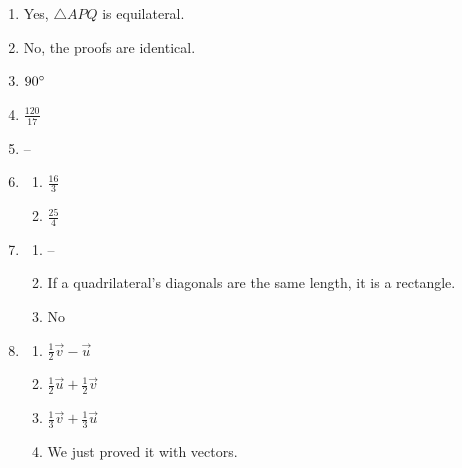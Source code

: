 \documentclass{article}
\begin{document}
\begin{enumerate}
\begin{enumerate}
	\item 104 in.$^2$
	
	\end{enumerate}
	
\item Yes, $\triangle APQ$ is equilateral.

\item No, the proofs are identical.

\item $90 \degree$

\item $\frac{120}{17}$

\item --

\item

	\begin{enumerate}
	
	\item $\frac{16}{3}$
	
	\item $\frac{25}{4}$
	
	\end{enumerate}
	
\item

	\begin{enumerate}
	
	\item --
	
	\item If a quadrilateral's diagonals are the same length, it is a rectangle.
	
	\item No
	
	\end{enumerate}
	
\item

	\begin{enumerate}
	
	\item $\frac{1}{2} \vec{v} - \vec{u}$
	
	\item $\frac{1}{2} \vec{u} + \frac{1}{2} \vec{v}$
	
	\item $\frac{1}{3} \vec{v} + \frac{1}{3} \vec{u}$
	
	\item We just proved it with vectors.
	
	\end{enumerate}
	

\end{enumerate}
\end{document}
